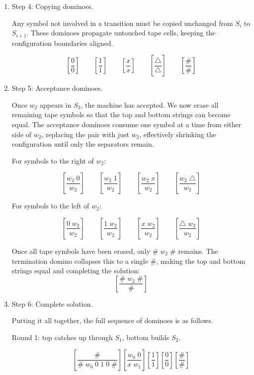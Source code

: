 \documentclass[12pt,a4paper,openany]{article}
\begin{document}
\begin{enumerate}
    \[
    \left[\frac{0}{0}\right]
    \qquad
    \left[\frac{\#}{\#}\right]
    \]

    \item Step 4: Copying dominoes.

    Any symbol not involved in a transition must be copied unchanged from $S_i$ to $S_{i+1}$.
    These dominoes propagate untouched tape cells, keeping the configuration boundaries aligned.

    \[
    \left[\frac{0}{0}\right]
    \qquad
    \left[\frac{1}{1}\right]
    \qquad
    \left[\frac{x}{x}\right]
    \qquad
    \left[\frac{\triangle}{\triangle}\right]
    \qquad
    \left[\frac{\#}{\#}\right]
    \]

    \item Step 5: Acceptance dominoes.

    Once $w_2$ appears in $S_3$, the machine has accepted. We now erase all remaining tape
    symbols so that the top and bottom strings can become equal. The acceptance dominoes consume
    one symbol at a time from either side of $w_2$, replacing the pair with just $w_2$,
    effectively shrinking the configuration until only the separators remain.

    For symbols to the right of $w_2$:
    
    \[
    \left[\frac{w_2\;0}{w_2}\right]
    \qquad
    \left[\frac{w_2\;1}{w_2}\right]
    \qquad
    \left[\frac{w_2\;x}{w_2}\right]
    \qquad
    \left[\frac{w_2\;\triangle}{w_2}\right]
    \]

    For symbols to the left of $w_2$:
    
    \[
    \left[\frac{0\;w_2}{w_2}\right]
    \qquad
    \left[\frac{1\;w_2}{w_2}\right]
    \qquad
    \left[\frac{x\;w_2}{w_2}\right]
    \qquad
    \left[\frac{\triangle\;w_2}{w_2}\right]
    \]

    Once all tape symbols have been erased, only $\#\;w_2\;\#$ remains. The termination
    domino collapses this to a single $\#$, making the top and bottom strings equal and
    completing the solution:
    \[
    \left[\frac{\#\;w_2\;\#}{\#}\right]
    \]

    \item Step 6: Complete solution.

    Putting it all together, the full sequence of dominoes is as follows.

    Round 1: top catches up through $S_1$, bottom builds $S_2$.
    
    \[
    \left[\frac{\#}{\#\;w_0\;0\;1\;0\;\#}\right]
    \left[\frac{w_0\;0}{x\;w_1}\right]
    \left[\frac{1}{1}\right]
    \left[\frac{0}{0}\right]
    \left[\frac{\#}{\#}\right]
    \]


\end{enumerate}
\end{document}
